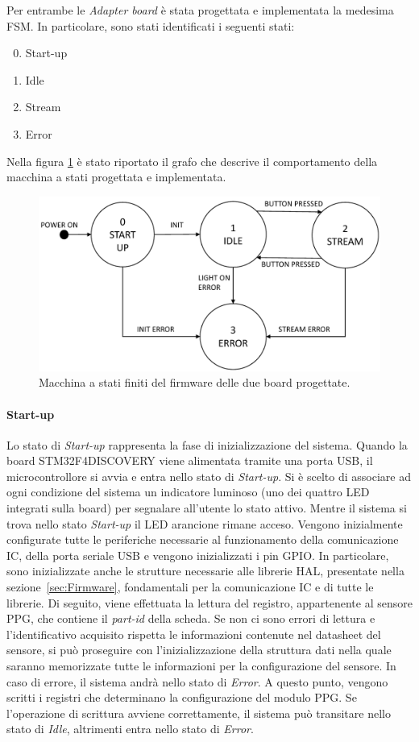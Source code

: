 Per entrambe le \textit{Adapter board} è stata progettata e implementata la medesima FSM. In particolare, sono stati identificati i seguenti stati:
\begin{enumerate}
	\setcounter{enumi}{-1}
	\item Start-up
	\item Idle
	\item Stream
	\item Error
\end{enumerate}
Nella figura \ref{fig:FSM} è stato riportato il grafo che descrive il comportamento della macchina a stati progettata e implementata.
\begin{figure}[b]
	\centering
	\includegraphics[width=0.6\linewidth]{ImageFiles/Macchina a stati finiti/FSM}
	\caption{Macchina a stati finiti del firmware delle due board progettate.}
	\label{fig:FSM}
\end{figure}

\paragraph{Start-up}
Lo stato di \textit{Start-up} rappresenta la fase di inizializzazione del sistema. Quando la board STM32F4DISCOVERY viene alimentata tramite una porta USB, il microcontrollore si avvia e entra nello stato di \textit{Start-up}. Si è scelto di associare ad ogni condizione del sistema un indicatore luminoso (uno dei quattro LED integrati sulla board) per segnalare all'utente lo stato attivo. Mentre il sistema si trova nello stato \textit{Start-up} il LED arancione rimane acceso. Vengono inizialmente configurate tutte le periferiche necessarie al funzionamento della comunicazione IC, della porta seriale USB e vengono inizializzati i pin GPIO. In particolare, sono inizializzate anche le strutture necessarie alle librerie HAL, presentate nella sezione~\ref{sec:Firmware}, fondamentali per la comunicazione IC e di tutte le librerie. Di seguito, viene effettuata la lettura del registro, appartenente al sensore PPG, che contiene il \textit{part-id} della scheda. Se non ci sono errori di lettura e l'identificativo acquisito rispetta le informazioni contenute nel datasheet del sensore, si può proseguire con l'inizializzazione della struttura dati nella quale saranno memorizzate tutte le informazioni per la configurazione del sensore. In caso di errore, il sistema andrà nello stato di \textit{Error}. A questo punto, vengono scritti i registri che determinano la configurazione del modulo PPG. Se l'operazione di scrittura avviene correttamente, il sistema può transitare nello stato di \textit{Idle}, altrimenti entra nello stato di \textit{Error}.
